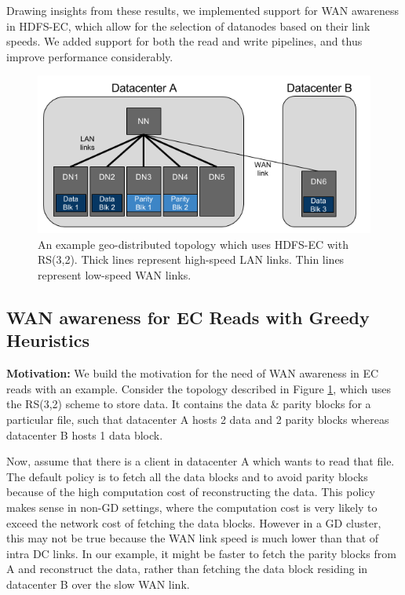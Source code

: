 \documentclass{sig-alternate-05-2015}
\begin{document}
Drawing insights from these results, we implemented support for WAN awareness in HDFS-EC, which allow for the selection of datanodes based on their link speeds. We added support for both the read and write pipelines, and thus improve performance considerably. 

\begin{figure}
\centering
\includegraphics[scale=0.45]{gda_diagram_2.png}
\caption{An example geo-distributed topology which uses HDFS-EC with RS(3,2). Thick lines represent high-speed LAN links. Thin lines represent low-speed WAN links.}
\label{gda-topo}
\end{figure} 

\subsection{WAN awareness for EC Reads with Greedy Heuristics}
\textbf{Motivation:} We build the motivation for the need of WAN awareness in EC reads with an example. Consider the topology described in Figure \ref{gda-topo}, which uses the RS(3,2) scheme to store data. It contains the data \& parity blocks for a particular file, such that datacenter A hosts 2 data and 2 parity blocks whereas datacenter B hosts 1 data block.

Now, assume that there is a client in datacenter A which wants to read that file. The default policy is to fetch all the data blocks and to avoid parity blocks because of the high computation cost of reconstructing the data. This policy makes sense in non-GD settings, where the computation cost is very likely to exceed the network cost of fetching the data blocks.  However in a GD cluster, this may not be true because the WAN link speed is much lower than that of intra DC links. In our example, it might be faster to fetch the parity blocks from A and reconstruct the data, rather than fetching the data block residing in datacenter B over the slow WAN link.
\end{document}

